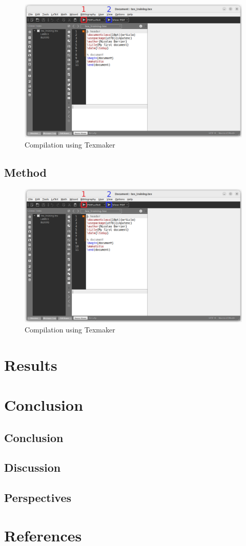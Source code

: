 \documentclass[12pt]{book}
\begin{document}
\begin{figure}[h!]
    \centering
    \includegraphics[width=0.5\linewidth]{figs/texmaker-1.png}
    \caption{Compilation using Texmaker}
\end{figure}

\lipsum[4-7]

\section{Method}

\lipsum[1-5]

\begin{figure}[h!]
    \centering
    \includegraphics[width=0.5\linewidth]{figs/texmaker-1.png}
    \caption{Compilation using Texmaker}
\end{figure}

\lipsum[6-7]

\chapter{Results}
\minitoc

\chapter{Conclusion}
\minitoc
\section{Conclusion}
\lipsum

\section{Discussion}
\lipsum

\section{Perspectives}
\lipsum


\lipsum[1-4]

\chapter*{References}

\nocite{*}
\end{document}
